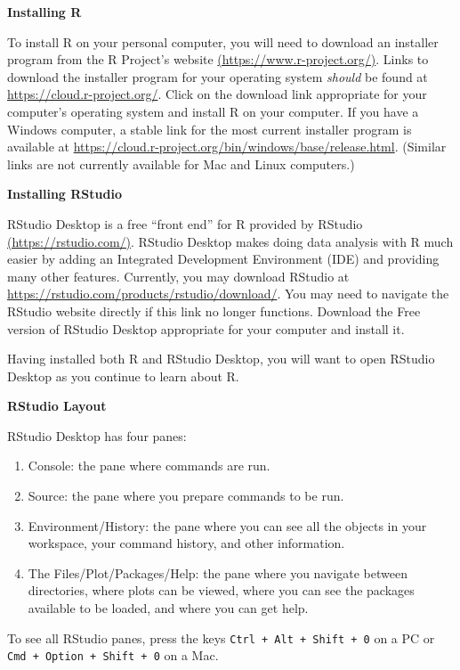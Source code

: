 \documentclass[
]{book}
\providecommand{\tightlist}{%
  \setlength{\itemsep}{0pt}\setlength{\parskip}{0pt}}
\theoremstyle{definition}
\theoremstyle{definition}
\theoremstyle{definition}
\theoremstyle{definition}
\theoremstyle{remark}
\begin{document}
\textbf{Installing R}

To install R on your personal computer, you will need to download an installer program from the R Project's website \href{https://www.r-project.org/}{(https://www.r-project.org/)}. Links to download the installer program for your operating system \emph{should} be found at \url{https://cloud.r-project.org/}. Click on the download link appropriate for your computer's operating system and install R on your computer. If you have a Windows computer, a stable link for the most current installer program is available at \url{https://cloud.r-project.org/bin/windows/base/release.html}. (Similar links are not currently available for Mac and Linux computers.)

\textbf{Installing RStudio}

RStudio Desktop is a free ``front end'' for R provided by RStudio \href{https://rstudio.com/}{(https://rstudio.com/)}. RStudio Desktop makes doing data analysis with R much easier by adding an Integrated Development Environment (IDE) and providing many other features. Currently, you may download RStudio at \url{https://rstudio.com/products/rstudio/download/}. You may need to navigate the RStudio website directly if this link no longer functions. Download the Free version of RStudio Desktop appropriate for your computer and install it.

Having installed both R and RStudio Desktop, you will want to open RStudio Desktop as you continue to learn about R.

\textbf{RStudio Layout}

RStudio Desktop has four panes:

\begin{enumerate}
\def\labelenumi{\arabic{enumi}.}
\tightlist
\item
  Console: the pane where commands are run.
\item
  Source: the pane where you prepare commands to be run.
\item
  Environment/History: the pane where you can see all the objects in your workspace, your command history, and other information.
\item
  The Files/Plot/Packages/Help: the pane where you navigate between directories, where plots can be viewed, where you can see the packages available to be loaded, and where you can get help.
\end{enumerate}

To see all RStudio panes, press the keys \texttt{Ctrl\ +\ Alt\ +\ Shift\ +\ 0} on a PC or \texttt{Cmd\ +\ Option\ +\ Shift\ +\ 0} on a Mac.
\end{document}
